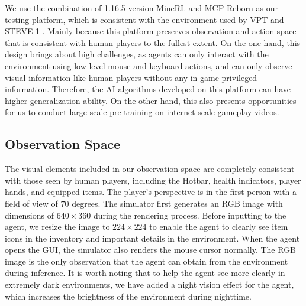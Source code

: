 \documentclass[11pt, a4paper, logo, one column]{craftjarvis}
\begin{document}
We use the combination of 1.16.5 version MineRL \citep{minerl} and MCP-Reborn as our testing platform, which is consistent with the environment used by VPT \citep{vpt} and STEVE-1 \citep{steve1}. Mainly because this platform preserves observation and action space that is consistent with human players to the fullest extent. On the one hand, this design brings about high challenges, as agents can only interact with the environment using low-level mouse and keyboard actions, and can only observe visual information like human players without any in-game privileged information. Therefore, the AI algorithms developed on this platform can have higher generalization ability. On the other hand, this also presents opportunities for us to conduct large-scale pre-training on internet-scale gameplay videos. 


\subsection{Observation Space}
The visual elements included in our observation space are completely consistent with those seen by human players, including the Hotbar, health indicators, player hands, and equipped items. The player's perspective is in the first person with a field of view of $70$ degrees. The simulator first generates an RGB image with dimensions of $640 \times 360$ during the rendering process. Before inputting to the agent, we resize the image to $224 \times 224$ to enable the agent to clearly see item icons in the inventory and important details in the environment. When the agent opens the GUI, the simulator also renders the mouse cursor normally. The RGB image is the only observation that the agent can obtain from the environment during inference. It is worth noting that to help the agent see more clearly in extremely dark environments, we have added a night vision effect for the agent, which increases the brightness of the environment during nighttime. 
\end{document}
